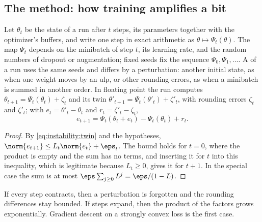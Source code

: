 \begin{refsection}
\section{The method: how training amplifies a bit}\label{sec:instability:dynamics}

Let $\theta_t$ be the state of a run after $t$ steps, its parameters together with the optimizer's buffers, and write one step in exact arithmetic as $\theta\mapsto\Psi_t(\theta)$. The map $\Psi_t$ depends on the minibatch of step $t$, its learning rate, and the random numbers of dropout or augmentation; fixed seeds fix the sequence $\Psi_0,\Psi_1,\dots$. A  of a run uses the same seeds and differs by a perturbation: another initial state, as when one weight moves by an ulp, or other rounding errors, as when a minibatch is summed in another order. In floating point the run computes $\theta_{t+1}=\Psi_t(\theta_t)+\zeta_t$ and its twin $\theta'_{t+1}=\Psi_t(\theta'_t)+\zeta'_t$, with rounding errors $\zeta_t$ and $\zeta'_t$; with $e_t=\theta'_t-\theta_t$ and $r_t=\zeta'_t-\zeta_t$,
\begin{equation}\label{eq:instability:twin}
  e_{t+1}=\Psi_t(\theta_t+e_t)-\Psi_t(\theta_t)+r_t .
\end{equation}


\begin{proof}
By \eqref{eq:instability:twin} and the hypotheses, $\norm{e_{t+1}}\le L_t\norm{e_t}+\eps_t$. The bound holds for $t=0$, where the product is empty and the sum has no terms, and inserting it for $t$ into this inequality, which is legitimate because $L_t\ge0$, gives it for $t+1$. In the special case the sum is at most $\eps\sum_{j\ge0}L^j=\eps/(1-L)$.
\end{proof}

If every step contracts, then a perturbation is forgotten and the rounding differences stay bounded. If steps expand, then the product of the factors grows exponentially. Gradient descent on a strongly convex loss is the first case.


\end{refsection}
